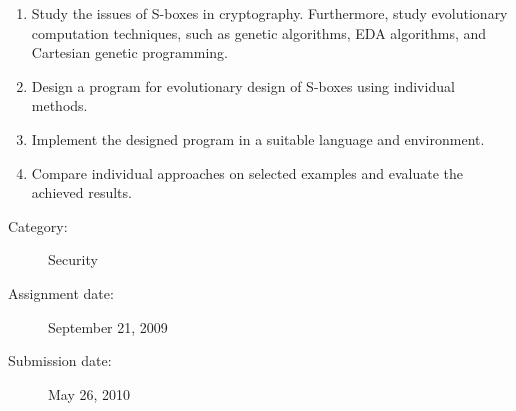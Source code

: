 %
%
%
%
%
 \begin{enumerate}
       \item Study the issues of S-boxes in cryptography. Furthermore, study evolutionary computation techniques, such as genetic algorithms, EDA algorithms, and Cartesian genetic programming.
       \item Design a program for evolutionary design of S-boxes using individual methods.
       \item Implement the designed program in a suitable language and environment.
       \item Compare individual approaches on selected examples and evaluate the achieved results.
 \end{enumerate}
 \medskip
 \begin{description}
   \item[Category:] Security
   \item[Assignment date:] September 21, 2009
   \item[Submission date:] May 26, 2010
 \end{description}
